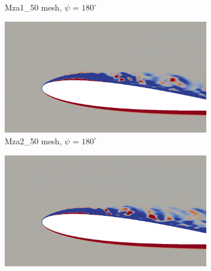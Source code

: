 \begin{figure}[H]
\begin{subfigure}[b]{0.475\textwidth}
		\caption{Mza1\_50 mesh, $\psi$ = $180^\circ$}
		\label{fig:Mza1_50_sp_psi180}
	\end{subfigure}
	\begin{subfigure}[b]{0.475\textwidth}
		\centering
		\includegraphics[width=1\textwidth]{figures/zonal_adapt_results/vorticity_plots/v2/Mza2_50/spavg/phase_180.png}
		\caption{Mza2\_50 mesh, $\psi$ = $180^\circ$}
		\label{fig:Mza2_50_sp_psi180}
	\end{subfigure}	
	\begin{subfigure}[b]{0.475\textwidth}
		\centering
		\includegraphics[width=1\textwidth]{figures/zonal_adapt_results/vorticity_plots/v2/Mza2_100/spavg/phase_180.png}

\end{subfigure}
\end{figure}
